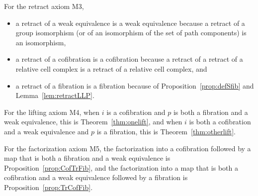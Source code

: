 \documentclass{amsart}
\numberwithin{equation}{section}
\theoremstyle{slplain}
\theoremstyle{definition}
\theoremstyle{remark}
\newcommand{\thmref}{Theorem~\ref}
\newcommand{\propref}{Proposition~\ref}
\newcommand{\lemref}{Lemma~\ref}
\begin{document}
For the retract axiom M3,
\begin{itemize}
\item a retract of a weak equivalence is a weak equivalence because a
  retract of a group isomorphism (or of an isomorphism of the set of
  path components) is an isomorphism,
\item a retract of a cofibration is a cofibration because a retract of
  a retract of a relative cell complex is a retract of a relative cell
  complex, and
\item a retract of a fibration is a fibration because of
  \propref{prop:defSfib} and \lemref{lem:retractLLP}.
\end{itemize}

For the lifting axiom M4, when $i$ is a cofibration and $p$ is both a
fibration and a weak equivalence, this is \thmref{thm:onelift}, and
when $i$ is both a cofibration and a weak equivalence and $p$ is a
fibration, this is \thmref{thm:otherlift}.

For the factorization axiom M5, the factorization into a cofibration
followed by a map that is both a fibration and a weak equivalence is
\propref{prop:CofTrFib}, and the factorization into a map that is both
a cofibration and a weak equivalence followed by a fibration is
\propref{prop:TrCofFib}.
\end{document}

